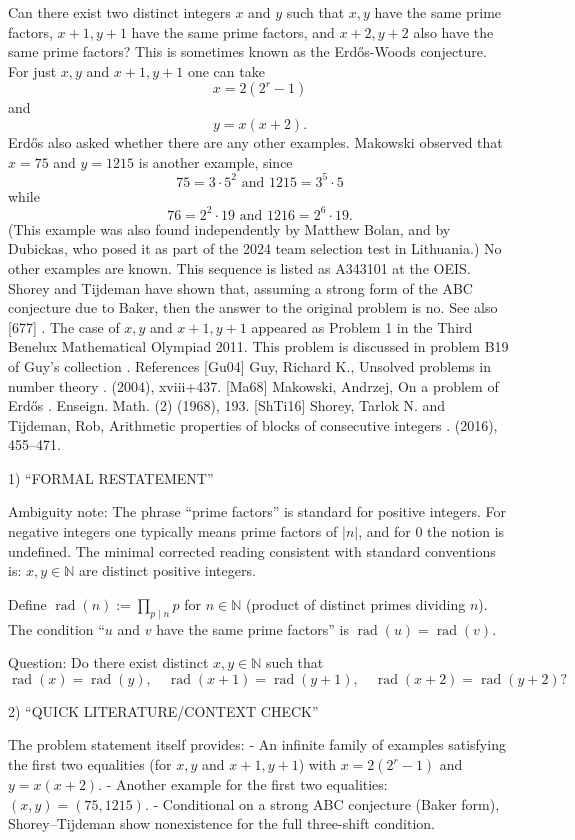 Can there exist two distinct integers $x$ and $y$ such that $x,y$ have the same prime factors, $x+1,y+1$ have the same prime factors, and $x+2,y+2$ also have the same prime factors? This is sometimes known as the Erd\H{o}s-Woods conjecture. For just $x,y$ and $x+1,y+1$ one can take\[x=2(2^r-1)\]and\[y = x(x+2).\]Erd\H{o}s also asked whether there are any other examples. Makowski \cite{Ma68} observed that $x=75$ and $y=1215$ is another example, since\[75 = 3\cdot 5^2 \textrm{ and }1215 = 3^5\cdot 5\]while\[76 = 2^2\cdot 19\textrm{ and }1216 = 2^6\cdot 19.\](This example was also found independently by Matthew Bolan, and by Dubickas, who posed it as part of the 2024 team selection test in Lithuania.) No other examples are known. This sequence is listed as A343101 at the OEIS. Shorey and Tijdeman \cite{ShTi16} have shown that, assuming a strong form of the ABC conjecture due to Baker, then the answer to the original problem is no. See also [677] . The case of $x,y$ and $x+1,y+1$ appeared as Problem 1 in the Third Benelux Mathematical Olympiad 2011. This problem is discussed in problem B19 of Guy's collection \cite{Gu04}. References [Gu04] Guy, Richard K., Unsolved problems in number theory . (2004), xviii+437. [Ma68] Makowski, Andrzej, On a problem of {E}rd\H{o}s . Enseign. Math. (2) (1968), 193. [ShTi16] Shorey, Tarlok N. and Tijdeman, Rob, Arithmetic properties of blocks of consecutive integers . (2016), 455--471.

1) “FORMAL RESTATEMENT”

Ambiguity note: The phrase “prime factors” is standard for positive integers. For negative integers one typically means prime factors of $|n|$, and for $0$ the notion is undefined. The minimal corrected reading consistent with standard conventions is: $x,y\in\mathbb{N}$ are distinct positive integers.

Define $\operatorname{rad}(n):=\prod_{p\mid n} p$ for $n\in\mathbb{N}$ (product of distinct primes dividing $n$). The condition “$u$ and $v$ have the same prime factors” is $\operatorname{rad}(u)=\operatorname{rad}(v)$.

Question: Do there exist distinct $x,y\in\mathbb{N}$ such that
\[
\operatorname{rad}(x)=\operatorname{rad}(y),\quad \operatorname{rad}(x+1)=\operatorname{rad}(y+1),\quad \operatorname{rad}(x+2)=\operatorname{rad}(y+2)?
\]

2) “QUICK LITERATURE/CONTEXT CHECK”

The problem statement itself provides:
- An infinite family of examples satisfying the first two equalities (for $x,y$ and $x+1,y+1$) with $x=2(2^r-1)$ and $y=x(x+2)$.
- Another example for the first two equalities: $(x,y)=(75,1215)$.
- Conditional on a strong ABC conjecture (Baker form), Shorey--Tijdeman show nonexistence for the full three-shift condition.

